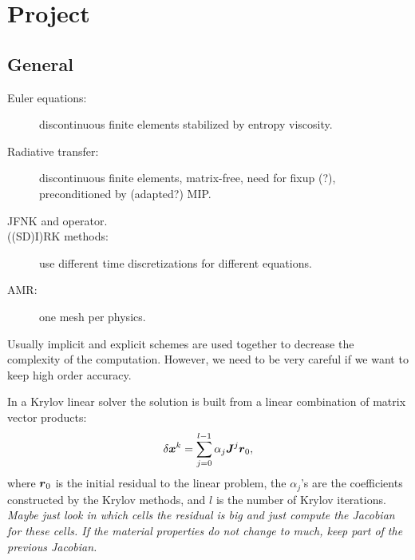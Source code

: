 \chapter{Project}
\section{General}
\begin{description}
  \item[Euler equations:] discontinuous finite elements stabilized by entropy
    viscosity.
  \item[Radiative transfer:] discontinuous finite elements, matrix-free,
    need for fixup (?), preconditioned by (adapted?) MIP.
  \item[JFNK and operator.]
  \item[((SD)I)RK methods:] use different time discretizations for different
    equations.
  \item[AMR:] one mesh per physics.
\end{description}
Usually implicit and explicit schemes are used together to decrease the
complexity of the computation. However, we need to be very careful if we want
to keep high order accuracy. 

In a Krylov linear solver the solution is built from a linear combination of
matrix vector products:
\begin{equation}
  \delta \boldsymbol{x}^k = \sum_{j=0}^{l-1} \alpha_j \boldsymbol{J}^j \boldsymbol{r}_0,
\end{equation}
where $\boldsymbol{r}_0$ is the initial residual to the linear problem, the
$\alpha_j$'s are the coefficients constructed by the Krylov methods, and $l$
is the number of Krylov iterations. \emph{Maybe just look in which cells the
residual is big and just compute the Jacobian for these cells. If the material
properties do not change to much, keep part of the previous Jacobian.}

